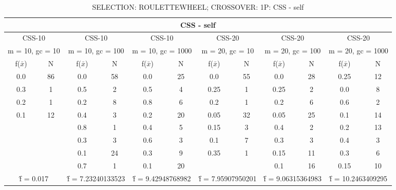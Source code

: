 \begin{table}[H]
	\centering
	\caption{SELECTION: ROULETTEWHEEL; CROSSOVER: 1P: CSS - self}
	\begin{adjustbox}{width=1\textwidth}
		\begin{tabular}{ |c|c||c|c||c|c||c|c||c|c||c|c| }
			\hline
			\multicolumn{12}{|c|}{CSS - self} \\
			\hline
			\multicolumn{2}{|c||}{CSS-10} & \multicolumn{2}{c||}{CSS-10} & \multicolumn{2}{c||}{CSS-10} & \multicolumn{2}{c||}{CSS-20} & \multicolumn{2}{c||}{CSS-20} & \multicolumn{2}{c|}{CSS-20}\\
			\hline
			\multicolumn{2}{|c||}{m = 10, gc = 10} & \multicolumn{2}{c||}{m = 10, gc = 100} & \multicolumn{2}{c||}{m = 10, gc = 1000} & \multicolumn{2}{c||}{m = 20, gc = 10} & \multicolumn{2}{c||}{m = 20, gc = 100} & \multicolumn{2}{c|}{m = 20, gc = 1000}\\
			\hline
			f($\bar{x}$) & N & f($\bar{x}$) & N & f($\bar{x}$) & N & f($\bar{x}$) & N & f($\bar{x}$) & N & f($\bar{x}$) & N\\
			\hline
			\hline
			0.0 & 86 & 0.0 & 58 & 0.0 & 25 & 0.0 & 55 & 0.0 & 28 & 0.25 & 12\\
			0.3 & 1 & 0.5 & 2 & 0.5 & 4 & 0.25 & 1 & 0.25 & 2 & 0.0 & 8\\
			0.2 & 1 & 0.2 & 8 & 0.8 & 6 & 0.2 & 1 & 0.2 & 6 & 0.6 & 2\\
			0.1 & 12 & 0.4 & 3 & 0.2 & 20 & 0.05 & 32 & 0.05 & 25 & 0.1 & 14\\
			&   & 0.8 & 1 & 0.4 & 5 & 0.15 & 3 & 0.4 & 2 & 0.2 & 13\\
			&   & 0.3 & 3 & 0.6 & 3 & 0.1 & 7 & 0.3 & 3 & 0.4 & 3\\
			&   & 0.1 & 24 & 0.3 & 9 & 0.35 & 1 & 0.15 & 11 & 0.3 & 6\\
			&   & 0.7 & 1 & 0.1 & 20 &   &   & 0.1 & 16 & 0.15 & 10\\
			\hline
			\multicolumn{2}{|c||}{\^{f} = 0.017} & \multicolumn{2}{c||}{\^{f} = 7.23240133523} & \multicolumn{2}{c||}{\^{f} = 9.42948768982} & \multicolumn{2}{c||}{\^{f} = 7.95907950201} & \multicolumn{2}{c||}{\^{f} = 9.06315364983} & \multicolumn{2}{c|}{\^{f} = 10.2463409295}\\
			\hline
		\end{tabular}
	\end{adjustbox}
\end{table}
